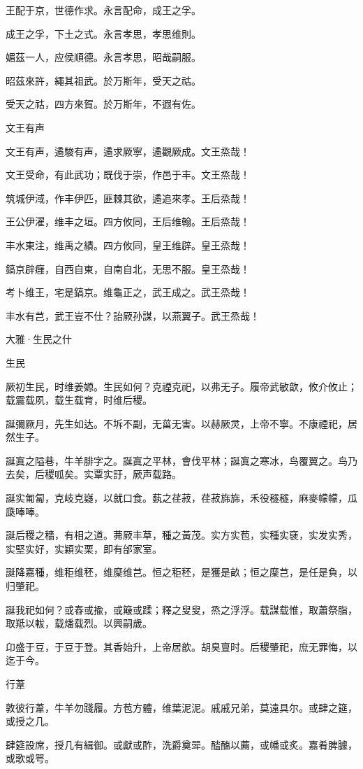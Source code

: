 王配于京，世德作求。永言配命，成王之孚。

成王之孚，下土之式。永言孝思，孝思维則。

媚茲一人，应侯順德。永言孝思，昭哉嗣服。

昭茲來許，繩其祖武。於万斯年，受天之祜。

受天之祜，四方來賀。於万斯年，不遐有佐。

文王有声

文王有声，遹駿有声，遹求厥寧，遹觀厥成。文王烝哉！

文王受命，有此武功；既伐于崇，作邑于丰。文王烝哉！

筑城伊淢，作丰伊匹，匪棘其欲，遹追來孝。王后烝哉！

王公伊濯，维丰之垣。四方攸同，王后维翰。王后烝哉！

丰水東注，维禹之績。四方攸同，皇王维辟。皇王烝哉！

鎬京辟癰，自西自東，自南自北，无思不服。皇王烝哉！

考卜维王，宅是鎬京。维龜正之，武王成之。武王烝哉！

丰水有芑，武王豈不仕？詒厥孙謀，以燕翼子。武王烝哉！




大雅·生民之什


生民

厥初生民，时维姜嫄。生民如何？克禋克祀，以弗无子。履帝武敏歆，攸介攸止；载震载夙，载生载育，时维后稷。

誕彌厥月，先生如达。不坼不副，无菑无害。以赫厥灵，上帝不寧。不康禋祀，居然生子。

誕寘之隘巷，牛羊腓字之。誕寘之平林，會伐平林；誕寘之寒冰，鸟覆翼之。鸟乃去矣，后稷呱矣。实覃实訏，厥声载路。

誕实匍匐，克岐克嶷，以就口食。蓺之荏菽，荏菽旆旆，禾役穟穟，麻麥幪幪，瓜瓞唪唪。

誕后稷之穡，有相之道。茀厥丰草，種之黃茂。实方实苞，实種实褎，实发实秀，实堅实好，实穎实栗，即有邰家室。

誕降嘉種，维秬维秠，维穈维芑。恒之秬秠，是獲是畝；恒之穈芑，是任是負，以归肇祀。

誕我祀如何？或舂或揄，或簸或蹂；釋之叟叟，烝之浮浮。载謀载惟，取蕭祭脂，取羝以軷，载燔载烈。以興嗣歲。

卬盛于豆，于豆于登。其香始升，上帝居歆。胡臭亶时。后稷肇祀，庶无罪悔，以迄于今。

行葦

敦彼行葦，牛羊勿踐履。方苞方體，维葉泥泥。戚戚兄弟，莫遠具尔。或肆之筵，或授之几。

肆筵設席，授几有緝御。或獻或酢，洗爵奠斝。醓醢以薦，或幡或炙。嘉肴脾臄，或歌或咢。


